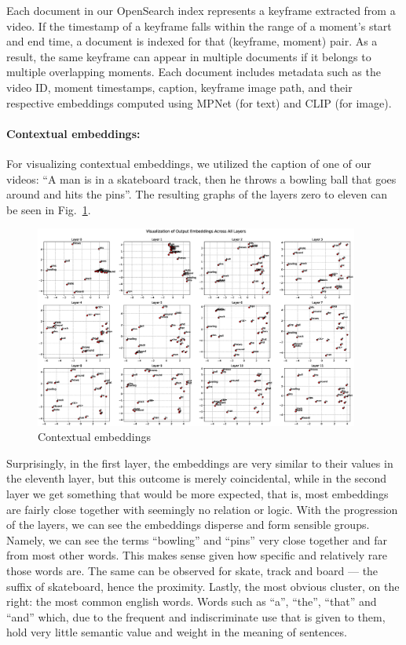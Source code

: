 \documentclass[runningheads]{llncs}
\begin{document}
\begin{sloppypar}
Each document in our OpenSearch index represents a keyframe extracted from a video. If the timestamp of a keyframe falls within the range of a moment's start and end time, a document is indexed for that (keyframe, moment) pair. As a result, the same keyframe can appear in multiple documents if it belongs to multiple overlapping moments. Each document includes metadata such as the video ID, moment timestamps, caption, keyframe image path, and their respective embeddings computed using MPNet (for text) and CLIP (for image).
\end{sloppypar}

\paragraph{Contextual embeddings:}For visualizing contextual embeddings, we utilized the caption of one of our videos: 
``A man is in a skateboard track, then he throws a bowling ball that goes around and hits the pins''. 
The resulting graphs of the layers zero to eleven can be seen in Fig.~\ref{hidden_layers}.


\begin{figure}
\includegraphics[width=0.95\textwidth]{../figures/hidden_layers.eps}
\caption{Contextual embeddings}\label{hidden_layers}
\end{figure}

Surprisingly, in the first layer, the embeddings are very similar to their values in the eleventh layer, but this outcome is merely coincidental, while in the second layer we get something that would be more expected, that is, most embeddings are fairly close together with seemingly no relation or logic. With the progression of the layers, we can see the embeddings disperse and form sensible groups. Namely, we can see the terms ``bowling'' and ``pins'' very close together and far from most other words. This makes sense given how specific and relatively rare those words are. The same can be observed for skate, track and board --- the suffix of skateboard, hence the proximity. Lastly, the most obvious cluster, on the right: the most common english words. Words such as ``a'', ``the'', ``that'' and ``and'' which, due to the frequent and indiscriminate use that is given to them, hold very little semantic value and weight in the meaning of sentences.
\end{document}
